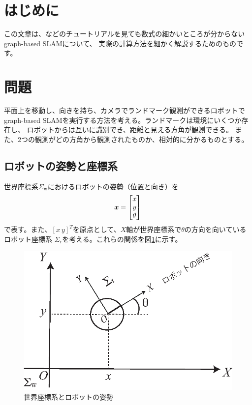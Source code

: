 \section{はじめに}

この文章は、\cite{grisetti2010}などのチュートリアルを見ても数式の細かいところが分からない
graph-based SLAMについて、
実際の計算方法を細かく解説するためのものです。

\section{問題}

平面上を移動し、向きを持ち、カメラでランドマーク観測ができるロボットで
graph-based SLAMを実行する方法を考える。ランドマークは環境にいくつか存在し、
ロボットからは互いに識別でき、距離と見える方角が観測できる。
また、2つの観測がどの方角から観測されたものか、相対的に分かるものとする。

\subsection{ロボットの姿勢と座標系}\label{sub:pose}

世界座標系$\Sigma_\text{w}$におけるロボットの姿勢（位置と向き）を
\begin{align}
	\boldsymbol{x} =
	\begin{bmatrix}
		x \\ y \\ \theta
	\end{bmatrix}
\end{align}
で表す。また、$[x\ y]^T$を原点として、$X$軸が世界座標系で$\theta$の方向を向いているロボット座標系
$\Sigma_\text{r}$を考える。これらの関係を図\ref{fig:coordinate}に示す。

\begin{figure}[htbp]
	\begin{center}
		\includegraphics[width=0.5\linewidth]{./figs/coordinate.eps}
		\caption{世界座標系とロボットの姿勢}
		\label{fig:coordinate}
	\end{center}
\end{figure}

